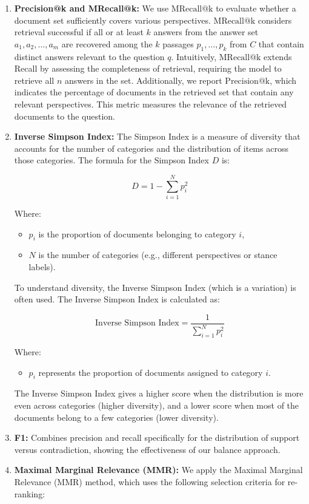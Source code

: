 \documentclass[sigconf]{acmart}
\begin{document}
\begin{enumerate}[left=0em] 
    \item \textbf{Precision@k and MRecall@k:} We use $ \text{MRecall@k} $ to evaluate whether a document set sufficiently covers various perspectives. $ \text{MRecall@k} $ considers retrieval successful if all or at least $ k $ answers from the answer set $ {a_1, a_2, \dots, a_m} $ are recovered among the $ k $ passages $ {p_1, \dots, p_k} $ from $ C $ that contain distinct answers relevant to the question $ q $. Intuitively, $ \text{MRecall@k} $ extends Recall by assessing the completeness of retrieval, requiring the model to retrieve all $ n $ answers in the set. 
    Additionally, we report $ \text{Precision@k} $, which indicates the percentage of documents in the retrieved set that contain any relevant perspectives. This metric measures the relevance of the retrieved documents to the question.
    \item \textbf{Inverse Simpson Index:} The Simpson Index is a measure of diversity that accounts for the number of categories and the distribution of items across those categories. The formula for the Simpson Index \( D \) is:

\[
D = 1 - \sum_{i=1}^{N} p_i^2
\]

Where:
\begin{itemize}[left=0em]
    \item \( p_i \) is the proportion of documents belonging to category \( i \),
    \item \( N \) is the number of categories (e.g., different perspectives or stance labels).
\end{itemize}

To understand diversity, the Inverse Simpson Index (which is a variation) is often used. The Inverse Simpson Index is calculated as:

$$
\text{Inverse Simpson Index} = \frac{1}{\sum\limits_{i=1}^{N} p_i^2}
$$

Where:
\begin{itemize}[left=0em]
    \item \( p_i \) represents the proportion of documents assigned to category \( i \).
\end{itemize}

The Inverse Simpson Index gives a higher score when the distribution is more even across categories (higher diversity), and a lower score when most of the documents belong to a few categories (lower diversity).


    \item \textbf{F1:} Combines precision and recall specifically for the distribution of support versus contradiction, showing the effectiveness of our balance approach.
     \item \textbf{Maximal Marginal Relevance (MMR):} We apply the Maximal Marginal Relevance (MMR) method, which uses the following selection criteria for re-ranking:


\end{enumerate}
\end{document}
